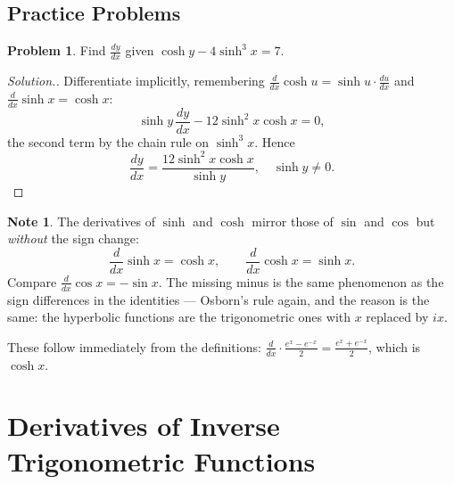 \documentclass[11pt,a4paper]{article}
\theoremstyle{definition}
\newtheorem{note}[thm]{Note}
\newtheorem{problemx}{Problem}[section]
\newenvironment{problem}{\begin{problemx}}{\end{problemx}}
\newenvironment{solution}
  {\renewcommand{\qedsymbol}{}\begin{proof}[\textit{Solution}.]}
  {\end{proof}}
\begin{document}
\pagebreak

\subsection{Practice Problems}

\begin{problem}
Find $\frac{dy}{dx}$ given $\cosh y-4\sinh^{3}x=7$.
\end{problem}

\begin{solution}
Differentiate implicitly, remembering
$\frac{d}{dx}\cosh u=\sinh u\cdot\frac{du}{dx}$ and
$\frac{d}{dx}\sinh x=\cosh x$:
$$\sinh y\,\frac{dy}{dx}-12\sinh^{2}x\cosh x=0 ,$$
the second term by the chain rule on $\sinh^{3}x$. Hence
$$\frac{dy}{dx}=\frac{12\sinh^{2}x\cosh x}{\sinh y},\quad \sinh y\neq 0 .$$
\end{solution}

\begin{note}
The derivatives of $\sinh$ and $\cosh$ mirror those of $\sin$ and $\cos$ but
\emph{without} the sign change:
$$\frac{d}{dx}\sinh x=\cosh x,\qquad \frac{d}{dx}\cosh x=\sinh x .$$
Compare $\frac{d}{dx}\cos x=-\sin x$. The missing minus is the same phenomenon as
the sign differences in the identities --- Osborn's rule again, and the reason is
the same: the hyperbolic functions are the trigonometric ones with $x$ replaced by
$ix$.

These follow immediately from the definitions:
$\frac{d}{dx}\cdot\frac{e^{x}-e^{-x}}{2}=\frac{e^{x}+e^{-x}}{2}$, which is
$\cosh x$.
\end{note}

\pagebreak
\section{Derivatives of Inverse Trigonometric Functions}
\end{document}
